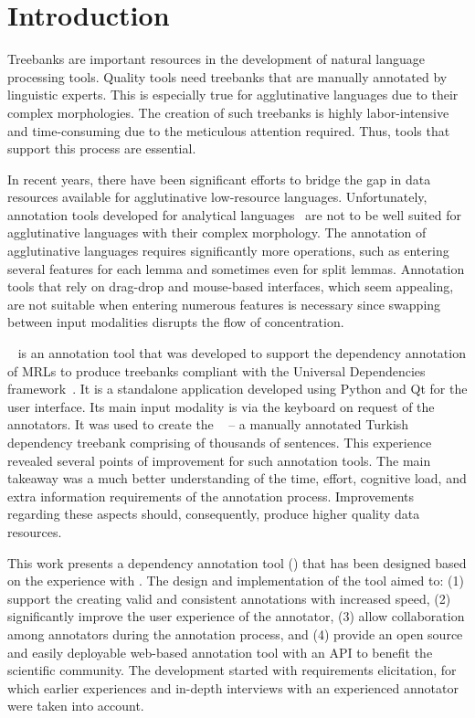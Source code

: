 \section{Introduction}
\label{sec:introduction}

Treebanks are important resources in the development of natural language processing tools.
Quality tools need treebanks that are manually annotated by linguistic experts.
This is especially true for agglutinative languages due to their complex morphologies.
The creation of such treebanks is highly labor-intensive and time-consuming due to the meticulous attention required.
Thus, tools that support this process are essential.

In recent years, there have been significant efforts to bridge the gap in data resources available for agglutinative low-resource languages.
Unfortunately, annotation tools developed for analytical languages~\cite{UD-tools} are not to be well suited for agglutinative languages with their complex morphology.
The annotation of agglutinative languages requires significantly more operations, such as entering several features for each lemma and sometimes even for split lemmas.
Annotation tools that rely on drag-drop and mouse-based interfaces, which seem appealing, are not suitable when entering numerous features is necessary since swapping between input modalities disrupts the flow of concentration.

\boatvone~\cite{turk2021resources} is an annotation tool that was developed to support the dependency annotation of MRLs to produce treebanks compliant with the Universal Dependencies framework~\cite{UD}.
It is a standalone application developed using Python and Qt for the user interface.
Its main input modality is via the keyboard on request of the annotators.
It was used to create the \bountreebank~\cite{turk-etal-2019-turkish,turk2021resources,UD-Boun-Treebank} -- a manually annotated Turkish dependency treebank comprising of thousands of sentences.
This experience revealed several points of improvement for such annotation tools.
The main takeaway was a much better understanding of the time, effort, cognitive load, and extra information requirements of the annotation process.
Improvements regarding these aspects should, consequently, produce higher quality data resources.

This work presents a dependency annotation tool (\boatvtwo) that has been designed based on the experience with \boatvone.
The design and implementation of the tool aimed to: (1) support the creating valid and consistent annotations with increased speed, (2) significantly improve the user experience of the annotator, (3) allow collaboration among annotators during the annotation process, and (4) provide an open source and easily deployable web-based annotation tool with an API to benefit the scientific community.
The development started with requirements elicitation, for which earlier experiences and in-depth interviews with an experienced annotator were taken into account.

